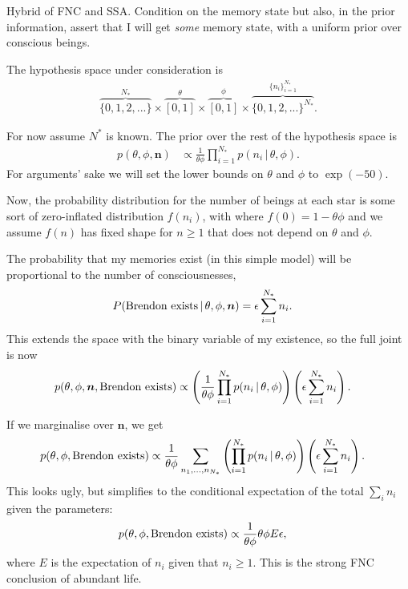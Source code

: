 \documentclass[a4paper, 12pt]{article}
\title{}
\author{}
\date{}
\newcommand{\given}{\,|\,}
\begin{document}
\maketitle


\setlength{\parindent}{0pt}
\setlength{\parskip}{8pt}

Hybrid of FNC and SSA. Condition on the memory state but also, in the prior
information, assert that I will get {\em some} memory state, with a uniform
prior over conscious beings.

The hypothesis space under consideration is
\begin{align}
\overbrace{\{0, 1, 2, ...\}}^{N_*} \times
\overbrace{[0, 1]}^{\theta} \times
\overbrace{[0, 1]}^{\phi} \times
\overbrace{\{0, 1, 2, ...\}^{N_*}}^{\{n_i\}_{i=1}^{N_*}}.
\end{align}

For now assume $N^*$ is known.
The prior over the rest of the hypothesis space is
\begin{align}
p(\theta, \phi, \boldsymbol{n}) &\propto
    \frac{1}{\theta\phi}\prod_{i=1}^{N_*} p(n_i \given \theta, \phi).
\end{align}
For arguments' sake we will set the lower bounds on $\theta$ and $\phi$
to $\exp(-50)$.

Now, the probability distribution for the number of beings at each
star is some sort of zero-inflated distribution $f(n_i)$, with
where $f(0) = 1 - \theta\phi$ and we assume $f(n)$ has fixed shape
for $n \geq 1$ that does not depend on $\theta$ and $\phi$.

The probability that my memories exist (in this simple model) will be
proportional to the number of consciousnesses,
\begin{align}
P(\textnormal{Brendon exists} \given \theta, \phi, \boldsymbol{n})
    &= \epsilon\sum_{i=1}^{N_*} n_i.
\end{align}
This extends the space with the binary variable of my existence, so the
full joint is now
\begin{align}
p(\theta, \phi, \boldsymbol{n}, \textnormal{Brendon exists}) &\propto
    \left(\frac{1}{\theta\phi}\prod_{i=1}^{N_*} p(n_i \given \theta, \phi)\right)
    \left(\epsilon\sum_{i=1}^{N_*} n_i\right).
\end{align}

If we marginalise over $\boldsymbol{n}$, we get
\begin{align}
p(\theta, \phi, \textnormal{Brendon exists}) &\propto
    \frac{1}{\theta\phi}
    \sum_{n_1, ..., n_{N_*}}
    \left(\prod_{i=1}^{N_*} p(n_i \given \theta, \phi)\right)
    \left(\epsilon\sum_{i=1}^{N_*} n_i\right).
\end{align}
This looks ugly, but simplifies to the conditional expectation of the total
$\sum_i n_i$ given the parameters:
\begin{align}
p(\theta, \phi, \textnormal{Brendon exists}) &\propto
    \frac{1}{\theta\phi}
    \theta\phi E \epsilon,
\end{align}
where $E$ is the expectation of $n_i$ given that $n_i \geq 1$.
This is the strong FNC conclusion of abundant life.
\end{document}
